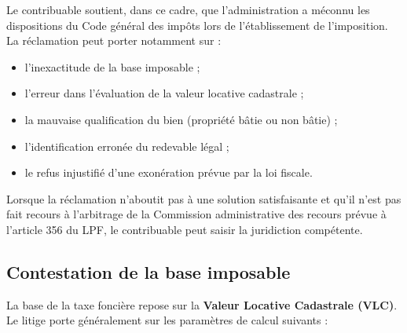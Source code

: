 \documentclass[Cours_contentieuxTF2026.tex]{subfiles}
\begin{document}
Le contribuable soutient, dans ce cadre, que l’administration a méconnu les
dispositions du Code général des impôts lors de l’établissement de l’imposition.
La réclamation peut porter notamment sur :
\begin{itemize}
	\item l’inexactitude de la base imposable ;
	\item l’erreur dans l’évaluation de la valeur locative cadastrale ;
	\item la mauvaise qualification du bien (propriété bâtie ou non bâtie) ;
	\item l’identification erronée du redevable légal ;
	\item le refus injustifié d’une exonération prévue par la loi fiscale.
\end{itemize}

Lorsque la réclamation n’aboutit pas à une solution satisfaisante et qu’il n’est pas fait
recours à l’arbitrage de la Commission administrative des recours prévue à l’article
356 du LPF, le contribuable peut saisir la juridiction compétente.

\subsection{Contestation de la base imposable}
La base de la taxe foncière repose sur la \textbf{Valeur Locative Cadastrale (VLC)}. Le litige porte généralement sur les paramètres de calcul suivants :
\end{document}
